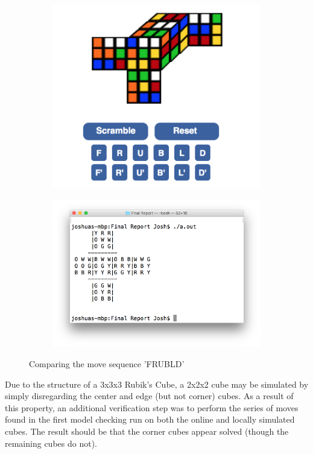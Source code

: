\documentclass{article}
\begin{document}
\begin{figure}[h]
\begin{subfigure}{.5\textwidth}
\includegraphics[width=\textwidth]{pics/3x3x3OnlineSim_Verification.png}
\end{subfigure}
\begin{subfigure}{.5\textwidth}
\includegraphics[width=\textwidth]{pics/3x3x3Sim_Verification.png}
\end{subfigure}
\caption{Comparing the move sequence 'FRUBLD'}
\end{figure}

\noindent Due to the structure of a 3x3x3 Rubik's Cube, a 2x2x2 cube may be simulated by simply disregarding the center and edge (but not corner) cubes. As a result of this property, an additional verification step was to perform the series of moves found in the first model checking run on both the online and locally simulated cubes. The result should be that the corner cubes appear solved (though the remaining cubes do not).
\end{document}
